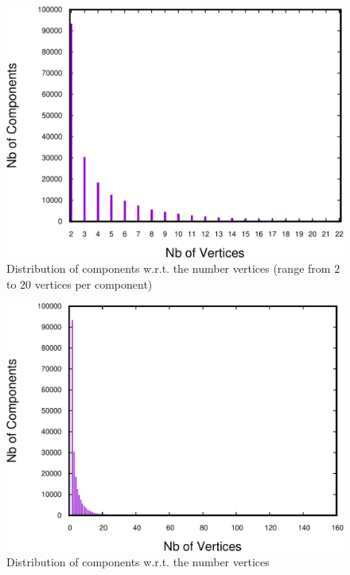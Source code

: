 \begin{figure}
\centering
\includegraphics[scale=0.35]{bench/generated/frequency20-crop.pdf}
\caption{Distribution of components w.r.t. the number vertices (range from $2$ to $20$ vertices per component)}
\label{fig:vertices-components-20}
\end{figure}

\begin{figure}
\centering
\includegraphics[scale=0.35]{bench/generated/frequencyall-crop.pdf}
\caption{Distribution of components w.r.t. the number vertices}
\label{fig:vertices-components-all}
\end{figure}

